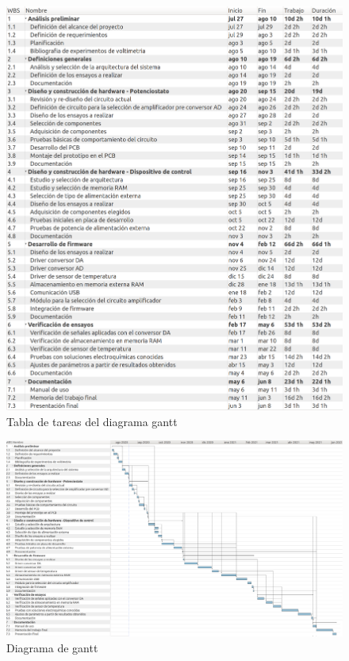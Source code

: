 \documentclass[11pt]{charter}
\begin{document}
\begin{figure}[H]
\centering 
\includegraphics[width=1\textwidth]{./Figuras/tabla_gantt.png}
\caption{Tabla de tareas del diagrama gantt}
\label{fig:gantt_tabla}
\end{figure}
\begin{landscape}
\begin{figure}[H]
\centering 
\includegraphics[width=1.6\textwidth]{./Figuras/gantt_full.png}
\caption{Diagrama de gantt}
\label{fig:gantt}
\end{figure}

\end{landscape}
\end{document}
